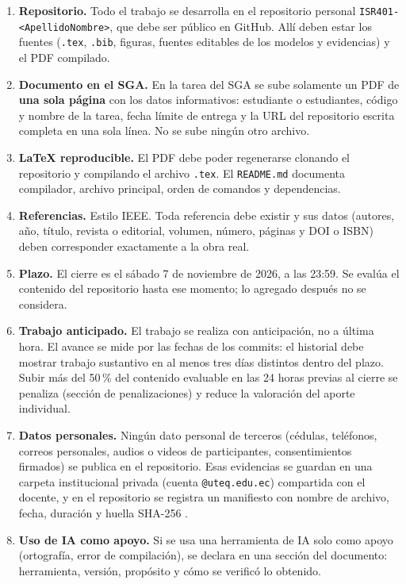 \documentclass[11pt]{article}
\begin{document}
\begin{enumerate}[leftmargin=20pt,itemsep=3pt]
	\item \textbf{Repositorio.} Todo el trabajo se desarrolla en el repositorio personal \texttt{ISR401-<ApellidoNombre>}, que debe ser público en GitHub. Allí deben estar los fuentes (\texttt{.tex}, \texttt{.bib}, figuras, fuentes editables de los modelos y evidencias) y el PDF compilado.
	\item \textbf{Documento en el SGA.} En la tarea del SGA se sube solamente un PDF de \textbf{una sola página} con los datos informativos: estudiante o estudiantes, código y nombre de la tarea, fecha límite de entrega y la URL del repositorio escrita completa en una sola línea. No se sube ningún otro archivo.
	\item \textbf{\LaTeX{} reproducible.} El PDF debe poder regenerarse clonando el repositorio y compilando el archivo \texttt{.tex}. El \texttt{README.md} documenta compilador, archivo principal, orden de comandos y dependencias.
	\item \textbf{Referencias.} Estilo IEEE. Toda referencia debe existir y sus datos (autores, año, título, revista o editorial, volumen, número, páginas y DOI o ISBN) deben corresponder exactamente a la obra real.
	\item \textbf{Plazo.} El cierre es el sábado 7 de noviembre de 2026, a las 23:59. Se evalúa el contenido del repositorio hasta ese momento; lo agregado después no se considera.
	\item \textbf{Trabajo anticipado.} El trabajo se realiza con anticipación, no a última hora. El avance se mide por las fechas de los commits: el historial debe mostrar trabajo sustantivo en al menos tres días distintos dentro del plazo. Subir más del 50\,\% del contenido evaluable en las 24 horas previas al cierre se penaliza (sección de penalizaciones) y reduce la valoración del aporte individual.
	\item \textbf{Datos personales.} Ningún dato personal de terceros (cédulas, teléfonos, correos personales, audios o videos de participantes, consentimientos firmados) se publica en el repositorio. Esas evidencias se guardan en una carpeta institucional privada (cuenta \texttt{@uteq.edu.ec}) compartida con el docente, y en el repositorio se registra un manifiesto con nombre de archivo, fecha, duración y huella SHA-256 \citep{lopdp_2021}.
	\item \textbf{Uso de IA como apoyo.} Si se usa una herramienta de IA solo como apoyo (ortografía, error de compilación), se declara en una sección del documento: herramienta, versión, propósito y cómo se verificó lo obtenido.
\end{enumerate}
\end{document}
